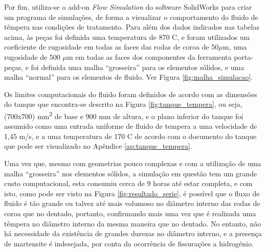 \par
Por fim, utiliza-se o add-on \textit{Flow Simulation} do software SolidWorks para criar um programa de simulações, de forma a visualizar o comportamento do fluido de têmpera nas condições de tratamento. Para além dos dados indicados nas tabelas acima, às peças foi definida uma temperatura de 870 \textdegree C, e foram utilizados um coeficiente de rugosidade em todas as faces das rodas de coroa de 50$\mu$m, uma rugosidade de 500 $\mu$m em todas as faces dos componentes da ferramenta porta-peças, e foi definida uma malha “grosseira” para os elementos sólidos, e uma malha “normal” para os elementos de fluido. Ver Figura \ref{fig:malha_simulacao}.
\par
Os limites computacionais do fluido foram definidos de acordo com as dimensões do tanque que encontra-se descrito na Figura \ref{fig:tanque_tempera}, ou seja, (700x700) mm\textsuperscript{2} de base e 900 mm de altura, e o plano inferior do tanque foi assumido como uma entrada uniforme de fluido de tempera a uma velocidade de 1,45 m/s, e a uma temperatura de 170 \textdegree C de acordo com o documento do tanque que pode ser visualizado no Apêndice \ref{ap:tanque_tempera}.
\newpage
\par
Uma vez que, mesmo com geometrias pouco complexas e com a utilização de uma malha “grosseira” nos elementos sólidos, a simulação em questão tem um grande custo computacional, esta consumiu cerca de 9 horas até estar completa, e com isto, como pode ser visto na Figura \ref{fig:resultado_serie}, é possível  que o fluxo de fluido é tão grande ou talvez até mais volumoso no diâmetro interno das rodas de coroa que no dentado, portanto, confirmando mais uma vez que é realizada uma têmpera no diâmetro interno da mesma maneira que no dentado. No entanto, não há necessidade da existência de grandes durezas no diâmetro interno, e a presença de martensite é indesejada, por conta da ocorrência de fissurações a hidrogénio.
